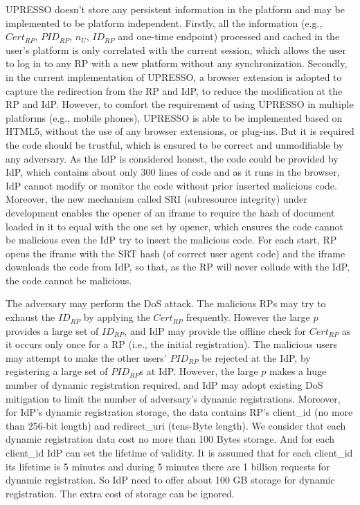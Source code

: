  UPRESSO doesn't store any persistent information in the platform and may be implemented to be platform independent. Firstly, all the information (e.g., $Cert_{RP}$, $PID_{RP}$, $n_U$, $ID_{RP}$ and one-time endpoint) processed and cached in the user's platform is only correlated with the current session, which allows the user to log in to any RP with a new platform without any synchronization. Secondly, in the current implementation of UPRESSO, a browser extension is adopted to capture the redirection from the RP and IdP, to reduce the modification at the RP and IdP.
However, to comfort the requirement of using UPRESSO in multiple platforms (e.g., mobile phones), UPRESSO is able to be implemented based on HTML5, without the use of any browser extensions, or plug-ins. But it is required the code should be trustful, which is ensured to be correct and unmodifiable by any adversary. As the IdP is considered honest, the code could be provided by IdP, which contains about only 300 lines of code and as it runs in the browser, IdP cannot modify or monitor the code without prior inserted malicious code. Moreover, the new mechanism called SRI (subresource integrity) under development enables the opener of an iframe to require the hash of document loaded in it to equal with the one set by opener, which ensures the code cannot be malicious even the IdP try to insert the malicious code. For each start, RP opens the iframe with the SRT hash (of correct user agent code) and the iframe downloads the code from IdP, so that, as the RP will never collude with the IdP, the code cannot be malicious.

 The adversary may perform the DoS attack. The malicious RPs may try to exhaust the $ID_{RP}$  by applying the $Cert_{RP}$ frequently. However the large $p$ provides a large set of $ID_{RP}$, and IdP may provide the offline check for $Cert_{RP}$ as it occurs only once for a RP (i.e., the initial registration). The malicious users may attempt to make the other users' $PID_{RP}$ be rejected at the IdP, by registering a large set of $PID_{RP}$s at IdP. However, the large $p$ makes a huge number of dynamic registration required, and IdP may adopt existing DoS mitigation to limit the number of adversary's dynamic registrations. Moreover, for IdP's dynamic registration storage, the data contains RP's client\_id (no more than 256-bit length) and redirect\_uri (tens-Byte length). We consider that each dynamic registration data cost no more than 100 Bytes storage. And for each client\_id IdP can set the lifetime of validity. It is assumed that for each client\_id its lifetime is 5 minutes and during 5 minutes there are 1 billion requests for dynamic registration. So IdP need to offer about 100 GB storage for dynamic registration. The extra cost of storage can be ignored.

